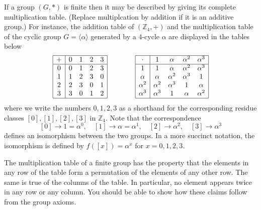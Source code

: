 \documentclass[11pt]{article}
\theoremstyle{definition}
\newcommand{\Z}{\mathbb{Z}} %
\newcommand{\gen}[1]{\langle #1 \rangle}
\begin{document}
If a group $(G,*)$ is finite then it may be described by giving its
complete multiplication table. (Replace multiplcation by addition if
it is an additive group.) For instance, the addition table of
$(\Z_4,+)$ and the multiplication table of the cyclic group $G =
\gen{\alpha}$ generated by a $4$-cycle $\alpha$ are displayed in the
tables below
\[
\begin{array}{|c|cccc|} \hline
+&0&1&2&3\\ \hline 
0&0&1&2&3\\ 1&1&2&3&0\\ 
2&2&3&0&1\\ 3&3&0&1&2\\ \hline
\end{array}
\qquad \qquad
\begin{array}{|c|cccc|} \hline
\cdot&1&\alpha&\alpha^2&\alpha^3\\ \hline 
1&1&\alpha&\alpha^2&\alpha^3\\ \alpha&\alpha&\alpha^2&\alpha^3&1\\ 
\alpha^2&\alpha^2&\alpha^3&1&\alpha\\ \alpha^3&\alpha^3&1&\alpha&\alpha^2\\ 
\hline
\end{array}
\]
where we write the numbers $0, 1, 2, 3$ as a shorthand for the
corresponding residue classes $[0], [1], [2], [3]$ in $\Z_4$. Note
that the correspondence 
\[
  [0] \to 1 = \alpha^0, \quad [1] \to \alpha = \alpha^1, \quad [2] \to
  \alpha^2, \quad [3] \to \alpha^3
\] 
defines an isomorphism between the two groups. In a more succinct
notation, the isomorphism is defined by $f([x]) = \alpha^x$ for $x =
0,1,2,3$.


The multiplication table of a finite group has the property that the
elements in any row of the table form a permutation of the elements of
any other row. The same is true of the columns of the table. In
particular, no element appears twice in any row or any column. You
should be able to show how these claims follow from the group axioms.
\end{document}
